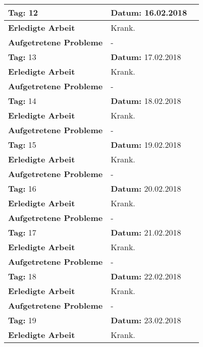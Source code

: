 \begin{longtable}{|p{5cm}|p{5cm}p{6cm}|}
\rowcolor{heading}\textbf{Tag:} 12 & \textbf{Datum:} 16.02.2018 & \\ \hline
\textbf{Erledigte Arbeit} & \multicolumn{2}{p{11cm}|}{Krank.} \\ \hline
\textbf{Aufgetretene Probleme} & \multicolumn{2}{p{11cm}|}{-} \\ \hline
\rowcolor{heading}\textbf{Tag:} 13 & \textbf{Datum:} 17.02.2018 & \\ \hline
\textbf{Erledigte Arbeit} & \multicolumn{2}{p{11cm}|}{Krank.} \\ \hline
\textbf{Aufgetretene Probleme} & \multicolumn{2}{p{11cm}|}{-} \\ \hline
\rowcolor{heading}\textbf{Tag:} 14 & \textbf{Datum:} 18.02.2018 & \\ \hline
\textbf{Erledigte Arbeit} & \multicolumn{2}{p{11cm}|}{Krank.} \\ \hline
\textbf{Aufgetretene Probleme} & \multicolumn{2}{p{11cm}|}{-} \\ \hline
\rowcolor{heading}\textbf{Tag:} 15 & \textbf{Datum:} 19.02.2018 & \\ \hline
\textbf{Erledigte Arbeit} & \multicolumn{2}{p{11cm}|}{Krank.} \\ \hline
\textbf{Aufgetretene Probleme} & \multicolumn{2}{p{11cm}|}{-} \\ \hline
\rowcolor{heading}\textbf{Tag:} 16 & \textbf{Datum:} 20.02.2018 & \\ \hline
\textbf{Erledigte Arbeit} & \multicolumn{2}{p{11cm}|}{Krank.} \\ \hline
\textbf{Aufgetretene Probleme} & \multicolumn{2}{p{11cm}|}{-} \\ \hline
\rowcolor{heading}\textbf{Tag:} 17 & \textbf{Datum:} 21.02.2018 & \\ \hline
\textbf{Erledigte Arbeit} & \multicolumn{2}{p{11cm}|}{Krank.} \\ \hline
\textbf{Aufgetretene Probleme} & \multicolumn{2}{p{11cm}|}{-} \\ \hline
\rowcolor{heading}\textbf{Tag:} 18 & \textbf{Datum:} 22.02.2018 & \\ \hline
\textbf{Erledigte Arbeit} & \multicolumn{2}{p{11cm}|}{Krank.} \\ \hline
\textbf{Aufgetretene Probleme} & \multicolumn{2}{p{11cm}|}{-} \\ \hline
\rowcolor{heading}\textbf{Tag:} 19 & \textbf{Datum:} 23.02.2018 & \\ \hline
\textbf{Erledigte Arbeit} & \multicolumn{2}{p{11cm}|}{Krank.} \\ \hline

\end{longtable}
